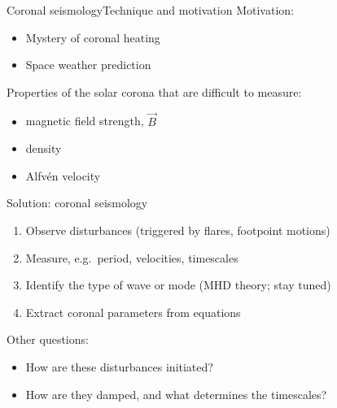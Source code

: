 \documentclass[table]{beamer}
\begin{document}
\begin{frame}{Coronal seismology}{Technique and motivation}
    Motivation:
    \begin{itemize}
        \item Mystery of coronal heating
        \item Space weather prediction
    \end{itemize}
    Properties of the solar corona that are difficult to measure:
    \begin{itemize}
        \item magnetic field strength, $\vec{B}$
        \item density
        \item Alfv\'en velocity
    \end{itemize}
    Solution: coronal seismology
    \begin{enumerate}
        \item Observe disturbances (triggered by flares, footpoint motions)
        \item Measure, e.g.\ period, velocities, timescales
        \item Identify the type of wave or mode (MHD theory; stay tuned)
        \item Extract coronal parameters from equations
    \end{enumerate}
    Other questions:
    \begin{itemize}
        \item How are these disturbances initiated?
        \item How are they damped, and what determines the timescales?
    \end{itemize}
\end{frame}%
\end{document}
